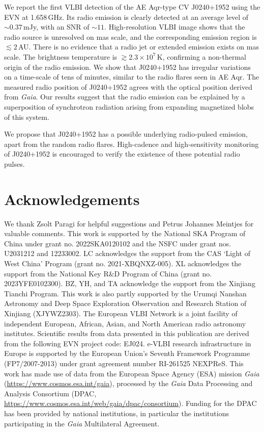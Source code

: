 \documentclass[fleqn,usenatbib]{mnras}
\begin{document}
We report the first VLBI detection of the AE Aqr-type CV J0240+1952 using the EVN at 1.658\,GHz. Its radio emission is clearly detected at an average level of $\sim0.37$\,mJy, with an SNR of $\sim11$. High-resolution VLBI image shows that the radio source is unresolved on mas scale, and the corresponding emission region is $\lesssim2$\,AU. There is no evidence that a radio jet or extended emission exists on mas scale. The brightness temperature is $\gtrsim2.3\times10^{7}$\,K, confirming a non-thermal origin of the radio emission. We show that J0240+1952 has irregular variations on a time-scale of tens of minutes, similar to the radio flares seen in AE Aqr. The measured radio position of J0240+1952 agrees with the optical position derived from \textit{Gaia}. Our results suggest that the radio emission can be explained by a superposition of synchrotron radiation arising from expanding magnetized blobs of this system.

We propose that J0240+1952 has a possible underlying radio-pulsed emission, apart from the random radio flares. High-cadence and high-sensitivity monitoring of J0240+1952 is encouraged to verify the existence of these potential radio pulses.

\section*{Acknowledgements}

We thank Zsolt Paragi for helpful suggestions and Petrus Johannes Meintjes for valuable comments.
This work is supported by the National SKA Program of China under grant no. 2022SKA0120102 and the NSFC under grant nos. U2031212 and 12233002. LC acknowledges the support from the CAS `Light of West China' Program (grant no. 2021-XBQNXZ-005). XL acknowledges the support from the National Key R\&D Program of China (grant no. 2023YFE0102300). BZ, YH, and TA acknowledge the support from the Xinjiang Tianchi Program. This work is also partly supported by the Urumqi Nanshan Astronomy and Deep Space Exploration Observation and Research Station of Xinjiang (XJYWZ2303).
The European VLBI Network is a joint facility of independent European, African, Asian, and North American radio astronomy institutes. Scientific results from data presented in this publication are derived from the following EVN project code: EJ024.
e-VLBI research infrastructure in Europe is supported by the European Union’s Seventh Framework Programme (FP7/2007-2013) under grant agreement number RI-261525 NEXPReS. 
This work has made use of data from the European Space Agency (ESA) mission {\it Gaia} (\url{https://www.cosmos.esa.int/gaia}), processed by the {\it Gaia} Data Processing and Analysis Consortium (DPAC, \url{https://www.cosmos.esa.int/web/gaia/dpac/consortium}). Funding for the DPAC has been provided by national institutions, in particular the institutions participating in the {\it Gaia} Multilateral Agreement. 
\end{document}
